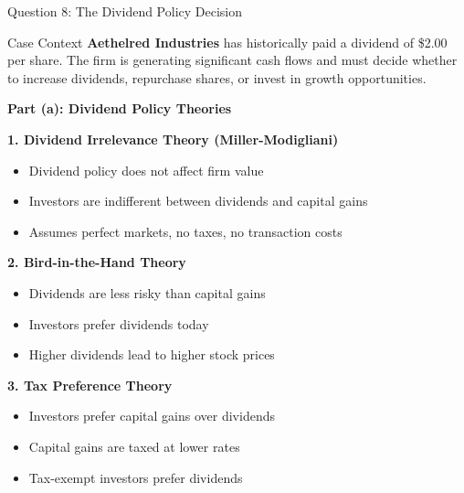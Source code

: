 \documentclass[aspectratio=169]{beamer}
\newcommand{\question}[1]{{\large\bfseries\color{crimson}#1}}
\begin{document}
	
	\begin{frame}{Question 8: The Dividend Policy Decision}
		\begin{block}{Case Context}
			\textbf{Aethelred Industries} has historically paid a dividend of \$2.00 per share. The firm is generating significant cash flows and must decide whether to increase dividends, repurchase shares, or invest in growth opportunities.
		\end{block}
		
		\question{Part (a): Dividend Policy Theories}
		
		\textbf{1. Dividend Irrelevance Theory (Miller-Modigliani)}
		\begin{itemize}
			\item Dividend policy does not affect firm value
			\item Investors are indifferent between dividends and capital gains
			\item Assumes perfect markets, no taxes, no transaction costs
		\end{itemize}
		
		\textbf{2. Bird-in-the-Hand Theory}
		\begin{itemize}
			\item Dividends are less risky than capital gains
			\item Investors prefer dividends today
			\item Higher dividends lead to higher stock prices
		\end{itemize}
		
		\textbf{3. Tax Preference Theory}
		\begin{itemize}
			\item Investors prefer capital gains over dividends
			\item Capital gains are taxed at lower rates
			\item Tax-exempt investors prefer dividends
		\end{itemize}
	\end{frame}
	
\end{document}
